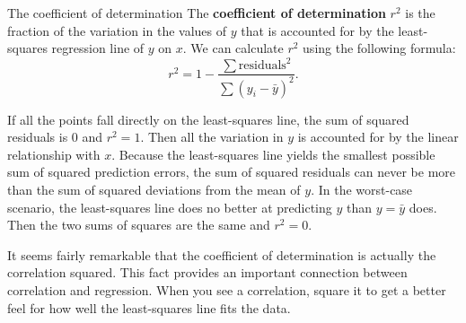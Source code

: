 \begin{definition}{The coefficient of determination}{}
    The \textbf{coefficient of determination} $r^2$ is the fraction of the variation in the values of $y$ that is accounted for by the least-squares regression line of $y$ on $x$. We can calculate $r^2$ using the following formula:
    \[
        r^2 = 1 - \dfrac{\sum\text{residuals}^2}{\sum(y_i - \bar{y})^2}.
    \]
\end{definition}

If all the points fall directly on the least-squares line, the sum of squared residuals is 0 and $r^2 = 1$. Then all the variation in $y$ is accounted for by the linear relationship with $x$. Because the least-squares line yields the smallest possible sum of squared prediction errors, the sum of squared residuals can never be more than the sum of squared deviations from the mean of $y$. In the worst-case scenario, the least-squares line does no better at predicting $y$ than $y = \bar{y}$ does. Then the two sums of squares are the same and $r^2 = 0$.

It seems fairly remarkable that the coefficient of determination is actually the correlation squared. This fact provides an important connection between correlation and regression. When you see a correlation, square it to get a better feel for how well the least-squares line fits the data.
